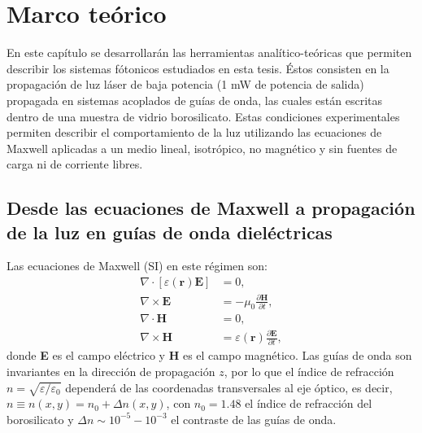 \chapter{Marco teórico}

En este capítulo se desarrollarán las herramientas analítico-teóricas que permiten describir los sistemas fótonicos estudiados en esta tesis. Éstos consisten en la propagación de luz láser de baja potencia (1 mW de potencia de salida) propagada en sistemas acoplados de guías de onda, las cuales están escritas dentro de una muestra de vidrio borosilicato. Estas condiciones experimentales permiten describir el comportamiento de la luz utilizando las ecuaciones de Maxwell aplicadas a un medio lineal, isotrópico, no magnético y sin fuentes de carga ni de corriente libres. 

\section{Desde las ecuaciones de Maxwell a propagación de la luz en guías de onda dieléctricas \label{cap:maxwell}}

Las ecuaciones de Maxwell (SI) en este régimen son:
\begin{align}
	\nabla\cdot\left[\varepsilon(\textbf{r})\textbf{E}\right] &= 0, \label{eqn:gauss}
	\\	
	\nabla\times\textbf{E} &= -\mu_0 \frac{\partial \textbf{H}}{\partial t}, \label{eqn:faraday-lenz}
	\\	
	\nabla\cdot\textbf{H} &= 0, \label{eqn:div0}
	\\	
	\nabla\times\textbf{H} &=\varepsilon(\textbf{r}) \frac{\partial \textbf{E}}{\partial t}, \label{eqn:ampere-maxwell}
\end{align}
donde \textbf{E} es el campo eléctrico y \textbf{H} es el campo magnético. Las guías de onda son invariantes en la dirección de propagación $z$, por lo que el índice de refracción $n=\sqrt{\varepsilon/\varepsilon_0}$ dependerá de las coordenadas transversales al eje óptico, es decir, $n \equiv n(x,y) = n_0 + \Delta n(x,y)$, con $n_0=1.48$ el índice de refracción del borosilicato y $\Delta n \sim 10^{-5}-10^{-3}$ el contraste de las guías de onda.

